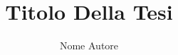 \documentclass[12pt,a4paper,openany,oneside]{book}
\begin{document}


\title{Titolo Della Tesi}
\author{Nome Autore}



\tableofcontents









\newpage
{}

\end{document}
